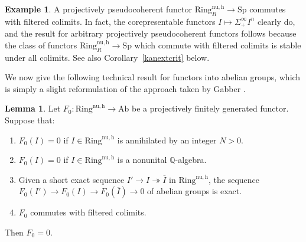 \documentclass{amsart}
\newcommand{\Sp}{\mathrm{Sp}}
\theoremstyle{definition}
\newtheorem{example}[definition]{Example}
\newtheorem{lemma}[definition]{Lemma}
\newcommand{\nuh}{\mathrm{Ring}^{\mathrm{nu,h}}_R}
\newcommand{\nuzh}{\mathrm{Ring}^{\mathrm{nu,h}}}
\begin{document}
\begin{example} 
A projectively pseudocoherent functor $\nuh \to \Sp$ commutes with filtered
colimits. In fact, the corepresentable functors $I \mapsto \Sigma^\infty_+ I^n$
clearly do, and the result for arbitrary projectively pseudocoherent functors
follows 
because the class of functors $\nuh \to \Sp$ which commute with filtered
colimits is stable under all colimits. 
See also Corollary~\ref{kanextcrit} below. 
\end{example} 

\label{Moved this around and rephrased language slightly}
We now give the following technical result for 
functors into abelian groups, which is simply a slight reformulation of the approach taken by Gabber
\cite{gabber}. \begin{lemma} \label{gabberlem}
Let $F_0: \nuzh \to \mathrm{Ab}$ be a projectively finitely generated functor. Suppose that: 
\begin{enumerate}
\item  
$F_0(I) = 0$ if $I \in \nuzh$ is annihilated by an integer $N > 0$. 
\item
$F_0(I) =
0$ if $I \in \nuzh$ is a nonunital $\mathbb{Q}$-algebra.
\item 
Given a short exact sequence $I' \to I \twoheadrightarrow \overline{I}$ in
$\nuzh$, the sequence $F_0(I') \to F_0(I) \to F_0(\overline{I}) \to 0$ of
abelian groups is exact.
\item $F_0$ commutes with filtered colimits. 
\end{enumerate}
 Then $F_0 = 0$. 
\end{lemma} 
\end{document}
